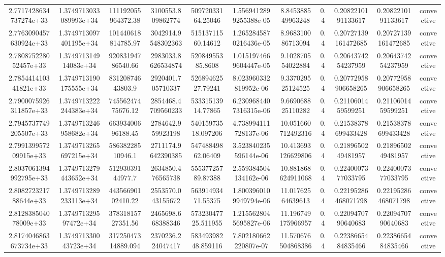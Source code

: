 \begin{table}
\begin{tabular}{ccccccccccc}
2.7717428634737274e+33 & 1.3749713033089993e+34 & 111192055964372.38 & 3100553.809862774 & 50972033164.25046 & 1.5569412899255388e-05 & 8.845388549963248 & 0.4 & 0.2082210191133617 & 0.2082210191133617 & convective \\
2.7763090457630924e+33 & 1.3749713097401195e+34 & 101440618814785.97 & 3042914.9548302363 & 51513711560.14612 & 1.2652845870216436e-05 & 8.968310086713094 & 0.4 & 0.20727139161472685 & 0.20727139161472685 & convective \\
2.780875228052457e+33 & 1.374971314914083e+34 & 92083194786540.66 & 2983033.8626534874 & 52084955385.8608 & 1.0151974669604447e-05 & 9.102870554022884 & 0.4 & 0.2064374254237959 & 0.2064374254237959 & convective \\
2.785441410341821e+33 & 1.3749713190175555e+34 & 83120874643803.9 & 2920401.705710337 & 52689462527.79241 & 8.023960332819952e-06 & 9.337029525124525 & 0.4 & 0.20772958906658265 & 0.20772958906658265 & convective \\
2.7900075926311857e+33 & 1.3749713222244383e+34 & 74556247475676.12 & 2854468.4709560233 & 53331513914.77865 & 6.2309684407316315e-06 & 9.669068825110282 & 0.4 & 0.2110601459599251 & 0.2110601459599251 & convective \\
2.7945737749205507e+33 & 1.3749713246958682e+34 & 66393400696188.45 & 2784642.959923198 & 54015973518.097206 & 4.738994111728137e-06 & 10.051660712492316 & 0.4 & 0.21538378699433428 & 0.21538378699433428 & convective \\
2.799139957209915e+33 & 1.3749713265697215e+34 & 58638228510946.1 & 2711174.9642390385 & 54748849862.06409 & 3.523840235596144e-06 & 10.413693126629806 & 0.4 & 0.2189650249481957 & 0.2189650249481957 & convective \\
2.8037061394992795e+33 & 1.3749713279443652e+34 & 51293039144977.7 & 2634850.476565738 & 55537725789.87388 & 2.559384504134162e-06 & 10.881868624911068 & 0.4 & 0.2240007377033795 & 0.2240007377033795 & convective \\
2.808272321788644e+33 & 1.3749713289233113e+34 & 44356690102410.22 & 2553570.043155672 & 56391493471.55375 & 1.8003960109949794e-06 & 11.01762564639613 & 0.4 & 0.22195286468071798 & 0.22195286468071798 & convective \\
2.812838504078009e+33 & 1.374971329597472e+34 & 37831815727351.56 & 2465698.668388346 & 57323047725.511955 & 1.2155628045695827e-06 & 11.196749175966957 & 0.4 & 0.2209470790640683 & 0.2209470790640683 & convective \\
2.8174046863673734e+33 & 1.374971330043723e+34 & 31725047314889.094 & 2370236.224047417 & 58349398248.859116 & 7.802180662220807e-07 & 11.570676504868386 & 0.4 & 0.2238665484835466 & 0.2238665484835466 & convective \\

\end{tabular}
\end{table}

